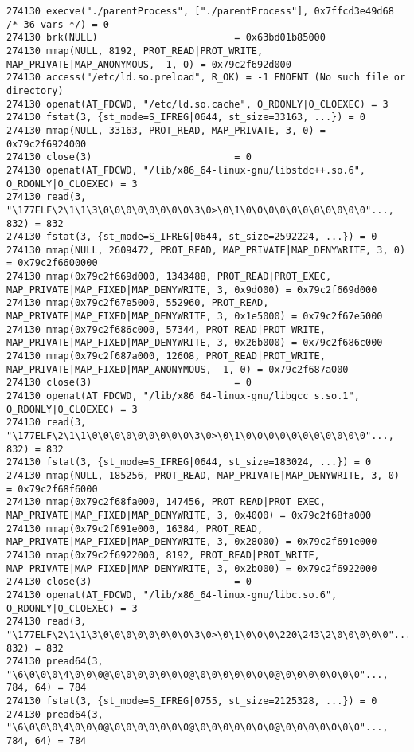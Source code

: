\begin{verbatim}
274130 execve("./parentProcess", ["./parentProcess"], 0x7ffcd3e49d68 /* 36 vars */) = 0
274130 brk(NULL)                        = 0x63bd01b85000
274130 mmap(NULL, 8192, PROT_READ|PROT_WRITE, MAP_PRIVATE|MAP_ANONYMOUS, -1, 0) = 0x79c2f692d000
274130 access("/etc/ld.so.preload", R_OK) = -1 ENOENT (No such file or directory)
274130 openat(AT_FDCWD, "/etc/ld.so.cache", O_RDONLY|O_CLOEXEC) = 3
274130 fstat(3, {st_mode=S_IFREG|0644, st_size=33163, ...}) = 0
274130 mmap(NULL, 33163, PROT_READ, MAP_PRIVATE, 3, 0) = 0x79c2f6924000
274130 close(3)                         = 0
274130 openat(AT_FDCWD, "/lib/x86_64-linux-gnu/libstdc++.so.6", O_RDONLY|O_CLOEXEC) = 3
274130 read(3, "\177ELF\2\1\1\3\0\0\0\0\0\0\0\0\3\0>\0\1\0\0\0\0\0\0\0\0\0\0\0"..., 832) = 832
274130 fstat(3, {st_mode=S_IFREG|0644, st_size=2592224, ...}) = 0
274130 mmap(NULL, 2609472, PROT_READ, MAP_PRIVATE|MAP_DENYWRITE, 3, 0) = 0x79c2f6600000
274130 mmap(0x79c2f669d000, 1343488, PROT_READ|PROT_EXEC, MAP_PRIVATE|MAP_FIXED|MAP_DENYWRITE, 3, 0x9d000) = 0x79c2f669d000
274130 mmap(0x79c2f67e5000, 552960, PROT_READ, MAP_PRIVATE|MAP_FIXED|MAP_DENYWRITE, 3, 0x1e5000) = 0x79c2f67e5000
274130 mmap(0x79c2f686c000, 57344, PROT_READ|PROT_WRITE, MAP_PRIVATE|MAP_FIXED|MAP_DENYWRITE, 3, 0x26b000) = 0x79c2f686c000
274130 mmap(0x79c2f687a000, 12608, PROT_READ|PROT_WRITE, MAP_PRIVATE|MAP_FIXED|MAP_ANONYMOUS, -1, 0) = 0x79c2f687a000
274130 close(3)                         = 0
274130 openat(AT_FDCWD, "/lib/x86_64-linux-gnu/libgcc_s.so.1", O_RDONLY|O_CLOEXEC) = 3
274130 read(3, "\177ELF\2\1\1\0\0\0\0\0\0\0\0\0\3\0>\0\1\0\0\0\0\0\0\0\0\0\0\0"..., 832) = 832
274130 fstat(3, {st_mode=S_IFREG|0644, st_size=183024, ...}) = 0
274130 mmap(NULL, 185256, PROT_READ, MAP_PRIVATE|MAP_DENYWRITE, 3, 0) = 0x79c2f68f6000
274130 mmap(0x79c2f68fa000, 147456, PROT_READ|PROT_EXEC, MAP_PRIVATE|MAP_FIXED|MAP_DENYWRITE, 3, 0x4000) = 0x79c2f68fa000
274130 mmap(0x79c2f691e000, 16384, PROT_READ, MAP_PRIVATE|MAP_FIXED|MAP_DENYWRITE, 3, 0x28000) = 0x79c2f691e000
274130 mmap(0x79c2f6922000, 8192, PROT_READ|PROT_WRITE, MAP_PRIVATE|MAP_FIXED|MAP_DENYWRITE, 3, 0x2b000) = 0x79c2f6922000
274130 close(3)                         = 0
274130 openat(AT_FDCWD, "/lib/x86_64-linux-gnu/libc.so.6", O_RDONLY|O_CLOEXEC) = 3
274130 read(3, "\177ELF\2\1\1\3\0\0\0\0\0\0\0\0\3\0>\0\1\0\0\0\220\243\2\0\0\0\0\0"..., 832) = 832
274130 pread64(3, "\6\0\0\0\4\0\0\0@\0\0\0\0\0\0\0@\0\0\0\0\0\0\0@\0\0\0\0\0\0\0"..., 784, 64) = 784
274130 fstat(3, {st_mode=S_IFREG|0755, st_size=2125328, ...}) = 0
274130 pread64(3, "\6\0\0\0\4\0\0\0@\0\0\0\0\0\0\0@\0\0\0\0\0\0\0@\0\0\0\0\0\0\0"..., 784, 64) = 784

\end{verbatim}

